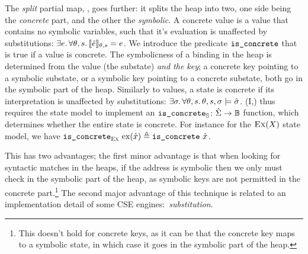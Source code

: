 The \emph{split} partial map, \SplitPMap, goes further: it splits the heap into two, one side being the \emph{concrete} part, and the other the \emph{symbolic}. A concrete value is a value that contains no symbolic variables, such that it's evaluation is unaffected by substitutions: $\exists e\ldotp \forall \theta,s\ldotp \llbracket\hat{e}\rrbracket_{\theta,s}=e$. We introduce the predicate $\texttt{is\_concrete}$ that is true if a value is concrete. The symbolicness of a binding in the heap is determined from the value (the substate) \emph{and the key}; a concrete key pointing to a symbolic substate, or a symbolic key pointing to a concrete substate, both go in the symbolic part of the heap. Similarly to values, a state is concrete if its interpretation is unaffected by substitutions: ${\exists \sigma\ldotp \forall \theta,s\ldotp \theta,s,\sigma\models \hat{\sigma}}$. \SplitPMap(I,\mmdl) thus requires the state model to implement an $\texttt{is\_concrete}_{\mathbb S}\colon \hat{\Sigma} \rightarrow \mathbb{B}$ function, which determines whether the entire state is concrete. For instance for the $\textsc{Ex}(X)$ state model, we have ${\texttt{is\_concrete}_{\textsc{Ex}}~\text{ex}(\hat{x})\triangleq \texttt{is\_concrete}~\hat{x}}$.

This has two advantages; the first minor advantage is that when looking for syntactic matches in the heaps, if the address is symbolic then we only must check in the symbolic part of the heap, as symbolic keys are not permitted in the concrete part.\footnote{This doesn't hold for concrete keys, as it can be that the concrete key maps to a symbolic state, in which case it goes in the symbolic part of the heap.} The second major advantage of this technique is related to an implementation detail of some CSE engines:~\emph{substitution}.

